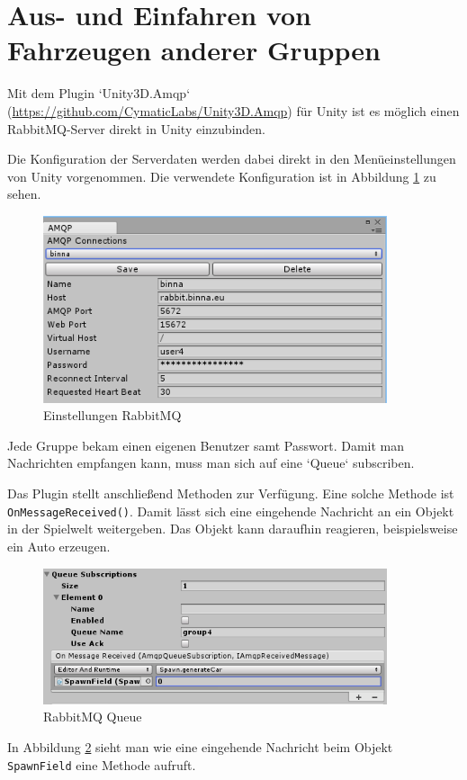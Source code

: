 \section{Aus- und Einfahren von Fahrzeugen anderer Gruppen}
\label{Aus-_und_Einfahren_von_Fahrzeugen_anderer_Gruppen}

Mit dem Plugin `Unity3D.Amqp` (\url{https://github.com/CymaticLabs/Unity3D.Amqp}) für Unity ist es möglich einen RabbitMQ-Server direkt in Unity einzubinden.

Die Konfiguration der Serverdaten werden dabei direkt in den Menüeinstellungen von Unity vorgenommen. Die verwendete Konfiguration ist in Abbildung \ref{img:rabbit} zu sehen.

\begin{figure}[H]
\begin{center}
	\includegraphics[width=0.9\textwidth]{BilderAllgemein/rabbitconfig.png}
\end{center}

	\caption{Einstellungen RabbitMQ}

	\label{img:rabbit}
\end{figure}

Jede Gruppe bekam einen eigenen Benutzer samt Passwort. Damit man Nachrichten empfangen kann, muss man sich auf eine `Queue` subscriben.

Das Plugin stellt anschließend Methoden zur Verfügung. Eine solche Methode ist \texttt{OnMessageReceived()}. Damit lässt sich eine eingehende Nachricht an ein Objekt in der Spielwelt weitergeben. Das Objekt kann daraufhin reagieren, beispielsweise ein Auto erzeugen.

\begin{figure}[H]
\begin{center}
	\includegraphics[width=0.9\textwidth]{BilderAllgemein/rabbitqueue.png}
\end{center}

	\caption{RabbitMQ Queue}

	\label{img:rabbitq}
\end{figure}

In Abbildung \ref{img:rabbitq} sieht man wie eine eingehende Nachricht beim Objekt \texttt{SpawnField} eine Methode aufruft.